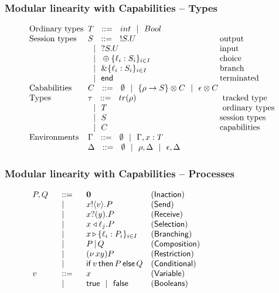 \begin{frame}\frametitle{Modular linearity with Capabilities -- Types}
  \begin{figure}[H]
    \centering
    $
    	\arraycolsep=1pt
    	\begin{array}{llll}
      \text{Ordinary types }
      &
       T \DEF  \tvar int \OR \tvar Bool \\

  		\text{Session types} &
        S	\DEF	\tout S U  & \text{output}\\
  			& \OR	\tin S U & \text{input}\\
  			& \OR	\tselI{\ell}{S} & \text{choice}\\
  			& \OR	\tbranchI{\ell}{S} & \text{branch} \\
  			& \OR	\tend & \text{terminated}\\
      \text{Cababilities}  &
       C \DEF \econtext
         \OR  \{\rho \gto S \} \otimes C
         \OR  \epsilon \otimes C \\
      \text{Types} &
       \tau \DEF tr(\rho) & \text{ tracked type} \\
           & \OR  T & \text{ ordinary types}\\
           & \OR  S &  \text{session types}\\
           & \OR  C & \text{capabilities}\\
      \text{Environments} &
       \Gamma \DEF \econtext \bnfbar \Gamma, x: T  \\
           & \Delta \DEF  \econtext \bnfbar \rho,\Delta \bnfbar \epsilon,\Delta\\
      \end{array}
  	$
  \end{figure}
\end{frame}

\begin{frame}\frametitle{Modular linearity with Capabilities -- Processes}
  \begin{figure}
    $
    	\begin{array}{llll}
    		P, Q &\ \ ::=\ \ & \mathbf{0} & \mathsf{{\displaystyle (Inaction)}}
    		\\
    		& \ \ |\ \  & x{}!\langle v\rangle. P & \mathsf{{\displaystyle (Send)}}
        \\
        & \ \ |\ \  & {x}{}?(y). P & \mathsf{{\displaystyle (Receive)}}
        \\
    		& \ \ |\ \  & x\triangleleft \ell_j. P & \mathsf{{\displaystyle (Selection)}}
        \\
        & \ \ |\ \  & x\,{\triangleright}\,\{\ell_i: P_i\}_{i \in I} & \mathsf{{\displaystyle (Branching)}}
        \\
        & \ \ |\ \  & P\,|\, Q & \mathsf{{\displaystyle (Composition)}}
    		\\
        & \ \ |\ \  & (\nu\,xy) P& \mathsf{{\displaystyle (Restriction)}}
    		\\
        & \ \ |\ \  & \mathsf{if}\,v\,\mathsf{then}\,P\,\mathsf{else}\,Q& \mathsf{{\displaystyle (Conditional)}}
        \\
        v &\ \ ::=\ \ & x & \mathsf{{\displaystyle (Variable)}}
        \\
        & \ \ |\ \  & \mathsf{true} \ \ |\ \  \mathsf{false} & \mathsf{{\displaystyle (Booleans)}}
    	\end{array}
    $
\end{figure}
\end{frame}


